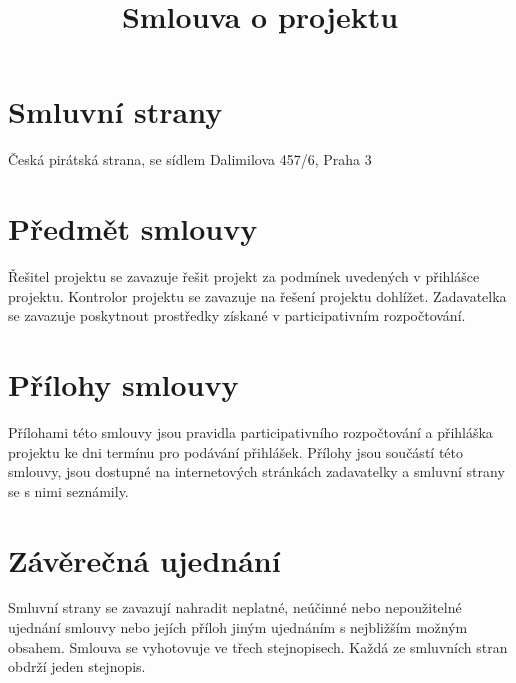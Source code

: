 \documentclass[11pt,a4paper,czech]{article}
\begin{document}
\title{Smlouva o projektu}

\begin{Form}

\section{Smluvní strany}

{
   Česká pirátská strana, se sídlem Dalimilova 457/6, Praha 3
   
}

{
     \hfill{} 
   
}

{
     \hfill{} 
   
}

\section{Předmět smlouvy}

Řešitel projektu se zavazuje řešit projekt za podmínek uvedených v přihlášce projektu. Kontrolor projektu se zavazuje na řešení projektu dohlížet. Zadavatelka se zavazuje poskytnout prostředky získané v participativním rozpočtování.

 \hfill{}  


\section{Přílohy smlouvy}

Přílohami této smlouvy jsou pravidla participativního rozpočtování a přihláška projektu ke dni termínu pro podávání přihlášek. Přílohy jsou součástí této smlouvy, jsou dostupné na internetových stránkách zadavatelky a smluvní strany se s nimi seznámily.

\section{Závěrečná ujednání}
Smluvní strany se zavazují nahradit neplatné, neúčinné nebo nepoužitelné ujednání smlouvy nebo jejích příloh jiným ujednáním s nejbližším možným obsahem. Smlouva se vyhotovuje ve třech stejnopisech. Každá ze smluvních stran obdrží jeden stejnopis.

 

\end{Form}

\hypersetup{pdfborder=0 0 0}
\end{document}
